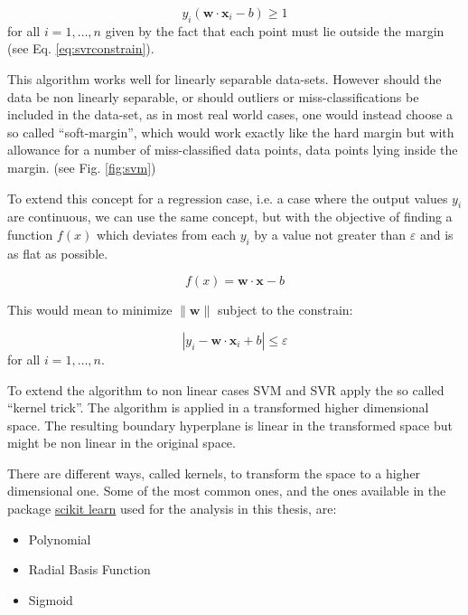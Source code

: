 \begin{equation}\label{eq:svmconstrain}
y_{i}({\mathbf {w}}\cdot {\mathbf {x}}_{i}-b)\geq 1
\end{equation}
for all $i=1,\ldots ,n$ given by the fact that each point must lie outside the margin (see Eq. \ref{eq:svrconstrain}).

This algorithm works well for linearly separable data-sets. However should the data be non linearly separable, or should outliers or miss-classifications be included in the data-set, as in most real world cases, one would instead choose a so called ``soft-margin'', which would work exactly like the hard margin but with allowance for a number of miss-classified data points, data points lying inside the margin. (see Fig. \ref{fig:svm})

To extend this concept for a regression case, i.e. a case where the output values $y_{i}$ are continuous, we can use the same concept, but with the objective of finding a function $f(x)$ which deviates from each $y_{i}$ by a value not greater than $\varepsilon$ and is as flat as possible.

\begin{equation}\label{eq:svr}
f(x) = \mathbf {w}\cdot \mathbf {x}-b
\end{equation}

This would mean to minimize $\|{\mathbf {w}}\|$ subject to the constrain:

\begin{equation}\label{eq:svrconstrain}
|y_{i} - {\mathbf {w}}\cdot {\mathbf {x}}_{i}+b|\leq \varepsilon
\end{equation}
for all $i=1,\ldots ,n$.

To extend the algorithm to non linear cases SVM and SVR apply the so called ``kernel trick''. The algorithm is applied in a transformed higher dimensional space. The resulting boundary hyperplane is linear in the transformed space but might be non linear in the original space.

There are different ways, called kernels, to transform the space to a higher dimensional one. Some of the most common ones, and the ones available in the package \href{https://scikit-learn.org/}{scikit learn} used for the analysis in this thesis, are:
\begin{itemize}
	\item Polynomial
	\item Radial Basis Function
	\item Sigmoid
\end{itemize} 

